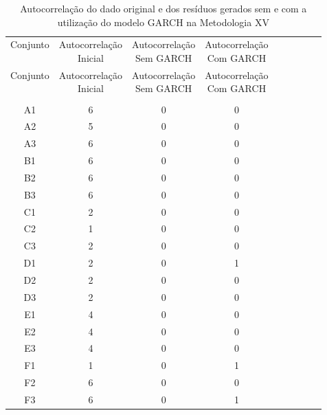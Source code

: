 \begin{center}
\begin{longtable}{ccccc|cccc}
\toprule
\rowcolor{white}
\caption[Metodologia XV: evolução da autocorrelação]{Autocorrelação do dado
original e dos resíduos gerados sem e com a utilização do modelo GARCH na
Metodologia XV} \label{tab:EvolucaoAutocorrelacaoMet15}\\
\midrule
Conjunto & \specialcell{Autocorrelação\\Inicial} & \specialcell{Autocorrelação\\Sem
GARCH} & \specialcell{Autocorrelação\\Com GARCH} \\
\midrule
\endfirsthead 
\midrule
\rowcolor{white}
Conjunto & \specialcell{Autocorrelação\\Inicial} & \specialcell{Autocorrelação\\Sem
GARCH} & \specialcell{Autocorrelação\\Com GARCH} \\
\toprule
\endhead
\midrule \\ %
\endfoot
\bottomrule 
\endlastfoot
A1    & 6     & 0     & 0 \\
A2    & 5     & 0     & 0 \\
A3    & 6     & 0     & 0 \\
B1    & 6     & 0     & 0 \\
B2    & 6     & 0     & 0 \\
B3    & 6     & 0     & 0 \\
C1    & 2     & 0     & 0 \\
C2    & 1     & 0     & 0 \\
C3    & 2     & 0     & 0 \\
D1    & 2     & 0     & 1 \\
D2    & 2     & 0     & 0 \\
D3    & 2     & 0     & 0 \\
E1    & 4     & 0     & 0 \\
E2    & 4     & 0     & 0 \\
E3    & 4     & 0     & 0 \\
F1    & 1     & 0     & 1 \\
F2    & 6     & 0     & 0 \\
F3    & 6     & 0     & 1 \\

\end{longtable}
\end{center}
